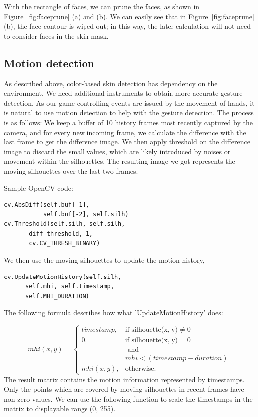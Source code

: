 \documentclass[10pt,twocolumn,letterpaper]{article}
\begin{document}
With the rectangle of faces, we can prune the faces, 
as shown in Figure~\ref{fig:faceprune} (a) and (b). We 
can easily see that in Figure~\ref{fig:faceprune} (b), the 
face contour is wiped out; in this way, 
the later calculation will not need to consider faces in the skin mask.

\subsection{Motion detection}
As described above, color-based skin detection has dependency on the environment. 
We need additional instruments to obtain more accurate gesture detection. As our 
game controlling events are issued by the movement of hands, it is natural to use motion 
detection to help with the gesture detection. The process is as follows:
We keep a buffer of 10 history frames most recently captured by the camera, 
and for every new incoming frame, we calculate the difference with the last frame 
to get the difference image. We then apply threshold on the difference image to discard 
the small values, which are likely introduced by noises or movement within the 
silhouettes. The resulting image we got represents the moving silhouettes over the 
last two frames.

Sample OpenCV code:
\begin{verbatim}
cv.AbsDiff(self.buf[-1], 
           self.buf[-2], self.silh)
cv.Threshold(self.silh, self.silh, 
       diff_threshold, 1, 
       cv.CV_THRESH_BINARY)
\end{verbatim}

We then use the moving silhouettes to update the motion history,
\begin{verbatim}
cv.UpdateMotionHistory(self.silh, 
      self.mhi, self.timestamp, 
      self.MHI_DURATION)
\end{verbatim}

The following formula describes how what 'UpdateMotionHistory' does:

\begin{equation}
mhi(x, y) = \begin{cases} timestamp, & \mbox{if silhouette(x, y)} \neq 0 \\ 
                          0, & \mbox{if silhouette(x, y)} = 0 \\
			  & \mbox{ and } \\
			  & mhi < (timestamp - duration) \\
			  mhi(x, y),  & \mbox{otherwise}.
			  \end{cases}
\end{equation}
The result matrix contains the motion information represented by timestamps. 
Only the points which are covered by moving silhouettes in recent frames 
have non-zero values. We can use the following function to scale the timestamps 
in the matrix to displayable range (0, 255).
\end{document}
